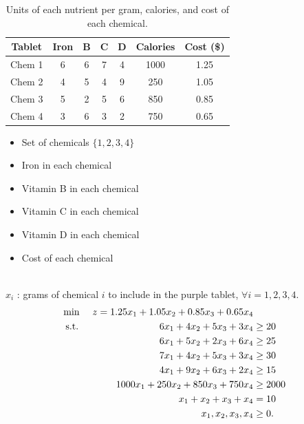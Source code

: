 \begin{table}[h!] \begin{center} \begin{tabular} {|c|c|c|c|c|c|c|}
\hline Tablet  & Iron  &  B &  C &  D & Calories & Cost (\$) \\ \hline
\hline  Chem 1  & 6    & 6         & 7         & 4         &  1000    & 1.25 \\
\hline  Chem 2  & 4    & 5         & 4         & 9         &  250     & 1.05 \\
\hline  Chem 3  & 5    & 2         & 5         & 6         &  850     & 0.85 \\
\hline  Chem 4  & 3    & 6         & 3         & 2         &  750     & 0.65 \\
\hline
\end{tabular} \end{center} \caption{Units of each nutrient per gram, calories, and cost of each chemical.}\label{tab:modeling-linear-programming-tab02}%
\end{table}

\begin{solution}

\smallskip {}
\begin{itemize}
\item Set of chemicals $\{1,2,3,4\}$
\end{itemize}
\smallskip {}
\begin{itemize}
\item Iron in each chemical
\item Vitamin B in each chemical
\item Vitamin C in each chemical
\item Vitamin D in each chemical
\item Cost of each chemical
\end{itemize}
\smallskip {} \\
$x_i$ : grams of chemical $i$ to include in the purple tablet, $\forall i = 1,2,3,4$.\\
\smallskip {}
\begin{align*}
\min\ && z = 1.25x_1 + 1.05x_2 + 0.85x_3 + 0.65x_4 \\
\mbox{ s.t. } &&  6x_1 + 4x_2 + 5x_3 + 3x_4 &\ge 20 \\
&& 6x_1 + 5x_2 + 2x_3 + 6x_4 &\ge 25  \\
&& 7x_1 + 4x_2 + 5x_3 + 3x_4 &\ge 30  \\
&& 4x_1 + 9x_2 + 6x_3 + 2x_4 &\ge 15  \\
&& 1000x_1 + 250x_2 + 850x_3 + 750x_4 &\ge 2000 \\
&& x_1 + x_2 + x_3 + x_4 &= 10  \\
&& x_1, x_2, x_3, x_4 &\ge 0. 
\end{align*}

\end{solution}

